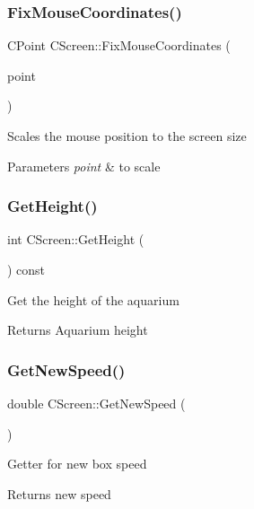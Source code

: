 \subsubsection{\texorpdfstring{FixMouseCoordinates()}{FixMouseCoordinates()}}
{\footnotesize\ttfamily C\+Point C\+Screen\+::\+Fix\+Mouse\+Coordinates (\begin{DoxyParamCaption}\item[{C\+Point \&}]{point }\end{DoxyParamCaption})}

Scales the mouse position to the screen size 
\begin{DoxyParams}{Parameters}
{\em point} & to scale \\
\hline
\end{DoxyParams}
\mbox{\label{class_c_screen_a1bde3a61effc114f5d859b0ffb237b75}} 
\subsubsection{\texorpdfstring{GetHeight()}{GetHeight()}}
{\footnotesize\ttfamily int C\+Screen\+::\+Get\+Height (\begin{DoxyParamCaption}{ }\end{DoxyParamCaption}) const\hspace{0.3cm}{\ttfamily [inline]}}

Get the height of the aquarium \begin{DoxyReturn}{Returns}
Aquarium height 
\end{DoxyReturn}
\mbox{\label{class_c_screen_a8ec35e05509f898ec58cc6aefbbb3389}} 
\subsubsection{\texorpdfstring{GetNewSpeed()}{GetNewSpeed()}}
{\footnotesize\ttfamily double C\+Screen\+::\+Get\+New\+Speed (\begin{DoxyParamCaption}{ }\end{DoxyParamCaption})\hspace{0.3cm}{\ttfamily [inline]}}

Getter for new box speed \begin{DoxyReturn}{Returns}
new speed 
\end{DoxyReturn}
\mbox{\label{class_c_screen_aaf50096762a0d8cd83b89637d8be7147}} 
